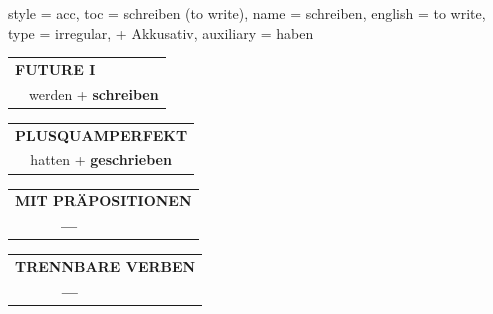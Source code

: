 \begin{verbentry}{
  style = {acc},
  toc = {schreiben (to write)},
  name = {schreiben},
  english = {to write},
  type = {irregular, + Akkusativ},
  auxiliary = {haben}
}
\begin{tabular}{rl}
    \multicolumn{2}{l}{\textbf{FUTURE I} }\\
  &  werden + \textbf{schreiben}\\
 
  \end{tabular}
\hfill
   \begin{tabular}{rl}
      \multicolumn{2}{l}{\textbf{PLUSQUAMPERFEKT}}\\
  &  hatten + \textbf{geschrieben}\\
  \end{tabular}
  
  
\vspace{10pt}

\begin{tabular}{lll}
\multicolumn{3}{l}{\textbf{MIT PRÄPOSITIONEN}}\\
& \textbf{---} & \\
\end{tabular}
\hfill
\begin{tabular}{lll}
\multicolumn{3}{l}{\textbf{TRENNBARE VERBEN}}\\
& \textbf{---} & \\
\end{tabular}
\vspace{-5pt}
\end{verbentry}

